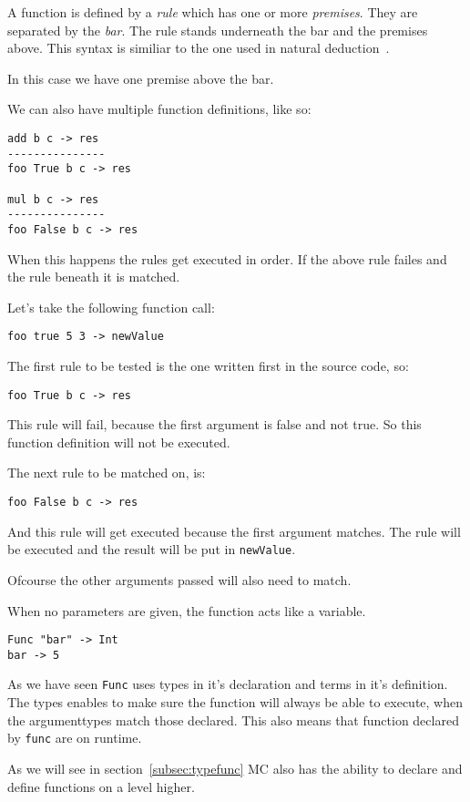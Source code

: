 A function is defined by a \emph{rule} which has one or more \emph{premises}.
They are separated by the \emph{bar}.
The rule stands underneath the bar and the premises above.
This syntax is similiar to the one used in natural deduction~\cite{}.

In this case we have one premise above the bar.

We can also have multiple function definitions, like so:
\begin{lstlisting}
add b c -> res
---------------
foo True b c -> res

mul b c -> res
---------------
foo False b c -> res
\end{lstlisting}

When this happens the rules get executed in order.
If the above rule failes and the rule beneath it is matched.

Let's take the following function call:
\begin{lstlisting}
foo true 5 3 -> newValue
\end{lstlisting}

The first rule to be tested is the one written first in the source code, so:
\begin{lstlisting}
foo True b c -> res
\end{lstlisting}
This rule will fail, because the first argument is false and not true.
So this function definition will not be executed.

The next rule to be matched on, is:
\begin{lstlisting}
foo False b c -> res
\end{lstlisting}
And this rule will get executed because the first argument matches.
The rule will be executed and the result will be put in \verb|newValue|.

Ofcourse the other arguments passed will also need to match.

When no parameters are given, the function acts like a variable.
\begin{lstlisting}
Func "bar" -> Int
bar -> 5
\end{lstlisting}

As we have seen \verb|Func| uses types in it's declaration and terms in it's definition.
The types enables to make sure the function will always be able to execute, when the argumenttypes match those declared.
This also means that function declared by \verb|func| are on runtime.

As we will see in section~\ref{subsec:typefunc} MC also has the ability to declare and define functions on a level higher.


